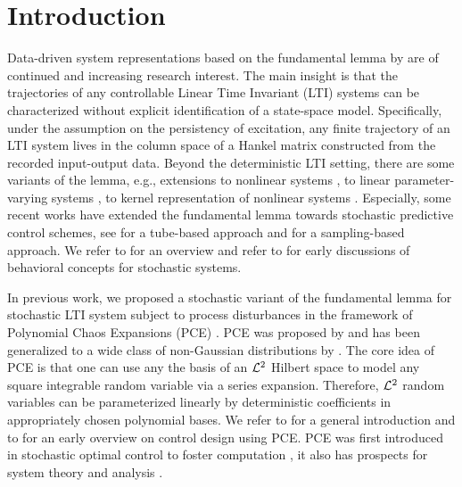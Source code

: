 \section{Introduction} \label{sec:Introduction}
Data-driven system representations based on the fundamental lemma by \citet{willems05note} are of continued and increasing research interest. The main insight is that the trajectories of any controllable Linear Time Invariant (LTI) systems can be characterized without explicit identification of a state-space model. Specifically, under the assumption on the persistency of excitation, any finite trajectory of an LTI system lives in the column space of a Hankel matrix constructed from the recorded input-output data. 
Beyond the deterministic LTI setting, there are some variants of the lemma, e.g., extensions to nonlinear systems \citep{alsalti21data,lian21koopman}, to linear parameter-varying systems \citep{verhoek21data}, to kernel representation of nonlinear systems \citep{molodchyk24exploring}. Especially, some recent works have extended the fundamental lemma towards stochastic predictive control schemes, see \citet{kerz23data} for a tube-based approach and \citet{teutsch24sampling} for a sampling-based approach. We refer to \citet{markovsky21behavioral} for an overview and refer to \citet{willems13open} for early discussions of behavioral concepts for stochastic systems.

In previous work, we proposed a stochastic variant of the fundamental lemma for stochastic LTI system subject to process disturbances in the framework of Polynomial Chaos Expansions (PCE) \citep{pan23stochastic}.
PCE was proposed by \citet{wiener38homogeneous} and has been generalized to a wide class of non-Gaussian distributions by \citet{xiu02wiener}. The core idea of PCE is that one can use any the basis of an $\mathcal{L}^2$  Hilbert space to model any square integrable random variable via a series expansion. Therefore, $\mathcal{L}^2$ random variables can be parameterized linearly by deterministic coefficients in appropriately chosen polynomial bases. We refer to \citet{sullivan15introduction} for a general introduction and to \citet{kim13wiener} for an early overview on control design using PCE. PCE was first introduced in stochastic optimal control to foster computation \citep{fagiano12nonlinear,paulson14fast}, it also has prospects for system theory and analysis \citep{paulson15stability, ahbe20region, faulwasser23behavioral}.

